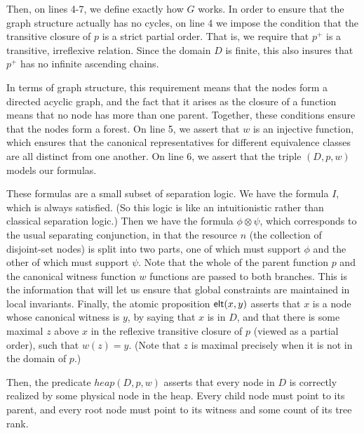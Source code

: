 Then, on lines 4-7, we define exactly how $G$ works. In order to
ensure that the graph structure actually has no cycles, on line 4 we
impose the condition that the transitive closure of $p$ is a strict
partial order. That is, we require that $p^+$ is a transitive,
irreflexive relation. Since the domain $D$ is finite, this also 
insures that $p^+$ has no infinite ascending chains. 

In terms of graph structure, this requirement means that the nodes
form a directed acyclic graph, and the fact that it arises as the
closure of a function means that no node has more than one parent.
Together, these conditions ensure that the nodes form a forest. On
line 5, we assert that $w$ is an injective function, which ensures
that the canonical representatives for different equivalence classes
are all distinct from one another. On line 6, we assert that the
triple $(D, p, w)$ models our formulas.

These formulas are a small subset of separation logic. We have the
formula $I$, which is always satisfied. (So this logic is like an
intuitionistic rather than classical separation logic.) Then we have
the formula $\phi \otimes \psi$, which corresponds to the usual
separating conjunction, in that the resource $n$ (the collection of
disjoint-set nodes) is split into two parts, one of which must support
$\phi$ and the other of which must support $\psi$. Note that the whole
of the parent function $p$ and the canonical witness function $w$
functions are passed to both branches. This is the information that
will let us ensure that global constraints are maintained in local
invariants. Finally, the atomic proposition $\mathsf{elt}({x}, {y})$ asserts that
$x$ is a node whose canonical witness is $y$, by saying that $x$ is in
$D$, and that there is some maximal $z$ above $x$ in the reflexive
transitive closure of $p$ (viewed as a partial order), such that $w(z)
= y$. (Note that $z$ is maximal precisely when it is not in the domain
of $p$.)

Then, the predicate $\mathit{heap}(D, p, w)$ asserts that every node
in $D$ is correctly realized by some physical node in the heap. Every
child node must point to its parent, and every root node must point 
to its witness and some count of its tree rank. 

